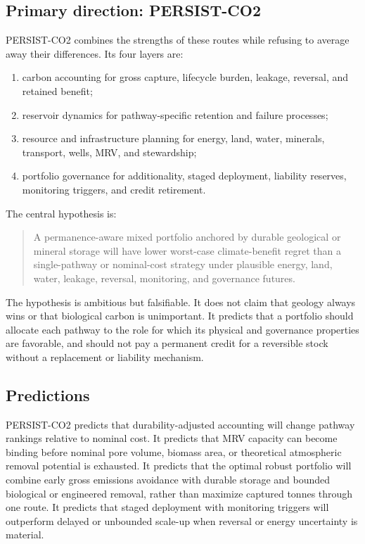 \documentclass[conference]{IEEEtran}
\begin{document}
\subsection{Primary direction: PERSIST-CO2}
PERSIST-CO2 combines the strengths of these routes while refusing to average away their differences. Its four layers are:
\begin{enumerate}
\item carbon accounting for gross capture, lifecycle burden, leakage, reversal, and retained benefit;
\item reservoir dynamics for pathway-specific retention and failure processes;
\item resource and infrastructure planning for energy, land, water, minerals, transport, wells, MRV, and stewardship;
\item portfolio governance for additionality, staged deployment, liability reserves, monitoring triggers, and credit retirement.
\end{enumerate}

The central hypothesis is:
\begin{quote}
A permanence-aware mixed portfolio anchored by durable geological or mineral storage will have lower worst-case climate-benefit regret than a single-pathway or nominal-cost strategy under plausible energy, land, water, leakage, reversal, monitoring, and governance futures.
\end{quote}

The hypothesis is ambitious but falsifiable. It does not claim that geology always wins or that biological carbon is unimportant. It predicts that a portfolio should allocate each pathway to the role for which its physical and governance properties are favorable, and should not pay a permanent credit for a reversible stock without a replacement or liability mechanism.

\subsection{Predictions}
PERSIST-CO2 predicts that durability-adjusted accounting will change pathway rankings relative to nominal cost. It predicts that MRV capacity can become binding before nominal pore volume, biomass area, or theoretical atmospheric removal potential is exhausted. It predicts that the optimal robust portfolio will combine early gross emissions avoidance with durable storage and bounded biological or engineered removal, rather than maximize captured tonnes through one route. It predicts that staged deployment with monitoring triggers will outperform delayed or unbounded scale-up when reversal or energy uncertainty is material.
\end{document}
